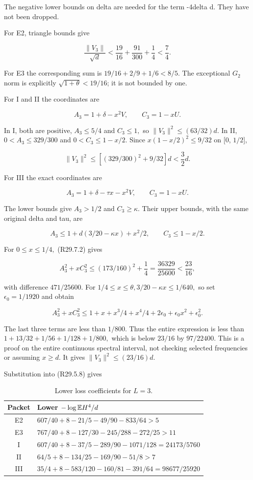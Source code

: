 The negative lower bounds on delta are needed for the term -4delta d.
They have not been dropped.

For E2, triangle bounds give

\[
\frac{\|V_3\|}{\sqrt d}
<\frac{19}{16}+\frac{91}{300}+\frac14<\frac74.
\]

For E3 the corresponding sum is
\(19/16+2/9+1/6<8/5.\) The exceptional \(G_2\) norm is explicitly
\(\sqrt{1+\theta}<19/16\); it is not bounded by one.

For I and II the coordinates are

\[
A_3=1+\delta-x^2V,\qquad C_3=1-xU.
\]

In I, both are positive, \(A_3\le 5/4\) and \(C_3\le 1,\allowbreak \) so
\(\lVert V_3\rVert ^2\le (63/32)d.\) In II,
\(0<A_3\le 329/300\) and \(0<C_3\le 1-x/2.\) Since
\(x(1-x/2)^2\le 9/32\) on [0, \(1/2\)],

\[
\|V_3\|^2\le[(329/300)^2+9/32]d<\frac32d.
\]

For III the exact coordinates are

\[
A_3=1+\delta-\tau x-x^2V,\qquad C_3=1-xU.
\tag{R29.7.1}
\]

The lower bounds give \(A_3>1/2\) and \(C_3\ge \kappa.\) Their upper bounds,
with the same original delta and tau, are

\[
A_3\le1+d(3/20-\kappa x)+x^2/2,\qquad C_3\le1-x/2.
\tag{R29.7.2}
\]

For \(0\le x\le 1/4,\allowbreak \) (R29.7.2) gives

\[
A_3^2+xC_3^2
\le(173/160)^2+\frac14
=\frac{36329}{25600}<\frac{23}{16},
\]

with difference \(471/25600.\) For \(1/4\le x\le \theta,\allowbreak  3/20-\kappa x\le 1/640,\allowbreak \) so set \(\epsilon_0=1/1920\) and obtain

\[
A_3^2+xC_3^2
\le1+x+x^3/4+x^4/4+
2\epsilon_0+\epsilon_0x^2+\epsilon_0^2.
\]

The last three terms are less than \(1/800.\) Thus the entire expression
is less than
\(1+13/32+1/56+1/128+1/800,\allowbreak \) which is below \(23/16\) by \(97/22400.\)
This is a proof on the entire continuous spectral interval, not
checking selected frequencies or assuming \(x\ge d.\) It gives
\(\lVert V_3\rVert ^2\le (23/16)d.\)

Substitution into (R29.5.8) gives

\begin{table}[htbp]
\centering\small
\setlength{\tabcolsep}{5pt}
\caption{Lower loss coefficients for $L=3$.}\label{tab:oc:r29-L3}
\begin{tabular}{cl}
\toprule
Packet & Lower $-\log\mathbb E H^4/d$\\
\midrule
E2 & $607/40+8-21/5-49/90-833/64>5$\\
E3 & $767/40+8-127/30-245/288-272/25>11$\\
I & $607/40+8-37/5-289/90-1071/128=24173/5760$\\
II & $64/5+8-134/25-169/90-51/8>7$\\
III & $35/4+8-583/120-160/81-391/64=98677/25920$\\
\bottomrule
\end{tabular}
\end{table}

